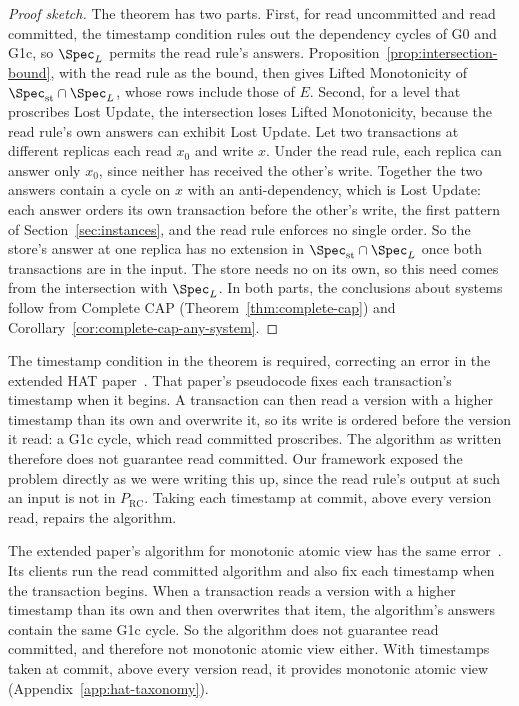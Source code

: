 \begin{proof}[Proof sketch]
The theorem has two parts.  First, for read uncommitted and read committed,
the timestamp condition rules out the dependency cycles of G0 and G1c, so
$\Spec_L$ permits the read rule's answers.
Proposition~\ref{prop:intersection-bound}, with the read rule as the bound,
then gives Lifted Monotonicity of $\Spec_{\mathrm{st}}\cap\Spec_L$, whose rows
include those of $E$.  Second, for a level that proscribes Lost Update, the
intersection loses Lifted Monotonicity, because the read rule's own answers can
exhibit Lost Update.  Let two transactions at different replicas each read
$x_0$ and write $x$.  Under the read rule, each replica can answer only $x_0$,
since neither has received the other's write.  Together the two answers contain
a cycle on $x$ with an anti-dependency, which is Lost Update: each answer
orders its own transaction before the other's write, the first pattern of
Section~\ref{sec:instances}, and the read rule enforces no single order.  So
the store's
answer at one replica has no extension in $\Spec_{\mathrm{st}}\cap\Spec_L$ once
both transactions are in the input.  The store needs no \commitment on its own,
so this need comes from the intersection with $\Spec_L$.  In both parts, the
conclusions about systems follow from Complete CAP
(Theorem~\ref{thm:complete-cap}) and
Corollary~\ref{cor:complete-cap-any-system}.
\end{proof}

The timestamp condition in the theorem is required, correcting an error in the
extended HAT paper~\cite{bailis2013hatextended}.  That paper's pseudocode
fixes each transaction's timestamp when it begins.  A transaction can then read
a version with a higher timestamp than its own and overwrite it, so its write
is ordered before the version it read: a G1c cycle, which read committed
proscribes.  The algorithm as written therefore does not guarantee read
committed.  Our framework exposed the problem directly as we were writing this
up, since the read rule's output at such an input is not in $P_{\mathrm{RC}}$.
Taking each timestamp at commit, above every version read, repairs the
algorithm.

The extended paper's algorithm for monotonic atomic view has the same
error~\cite[App.~B]{bailis2013hatextended}.  Its clients run the read committed
algorithm and also fix each timestamp when the transaction begins.  When a
transaction reads a version with a higher timestamp than its own and then
overwrites that item, the algorithm's answers contain the same G1c cycle.  So
the algorithm does not guarantee read committed, and therefore not monotonic
atomic view either.  With timestamps taken at commit, above every version
read, it provides monotonic atomic view (Appendix~\ref{app:hat-taxonomy}).


